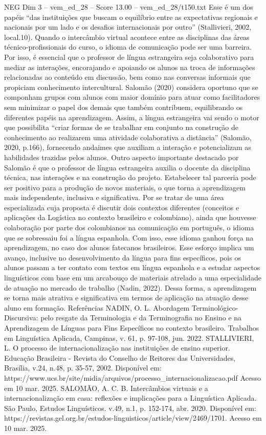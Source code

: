\begin{textsample}{NEG Dim 3 – vem\_ed\_28 – Score 13.00 – vem\_ed\_28/t150.txt}
Esse é um dos papéis “das instituições que buscam o equilíbrio entre as expectativas regionais e nacionais por um lado e os desafios internacionais por outro” (Stallivieri, 2002, local.10).
Quando o intercâmbio virtual acontece entre as disciplinas das áreas técnico-profissionais do curso, o idioma de comunicação pode ser uma barreira.
Por isso, é essencial que o professor de língua estrangeira seja colaborativo para mediar as interações, encorajando e apoiando os alunos na troca de informações relacionadas ao conteúdo em discussão, bem como nas conversas informais que propiciam conhecimento intercultural.
Salomão (2020) considera oportuno que se componham grupos com alunos com maior domínio para atuar como facilitadores sem minimizar o papel dos demais que também contribuem, equilibrando os diferentes papéis na aprendizagem.
Assim, a língua estrangeira vai sendo o motor que possibilita “criar formas de se trabalhar em conjunto na construção de conhecimento ao realizarem uma atividade colaborativa a distância” (Salomão, 2020, p.166), fornecendo andaimes que auxiliam a interação e potencializam as habilidades trazidas pelos alunos.
Outro aspecto importante destacado por Salomão é que o professor de língua estrangeira auxilia o docente da disciplina técnica, nas interações e na construção do projeto.
Estabelecer tal parceria pode ser positivo para a produção de novos materiais, o que torna a aprendizagem mais independente, inclusiva e significativa.
Por se tratar de uma área especializada cuja proposta é discutir dois contextos diferentes (conceitos e aplicações da Logística no contexto brasileiro e colombiano), ainda que houvesse colaboração por parte dos colombianos na comunicação em português, o idioma que se sobressaiu foi a língua espanhola.
Com isso, esse idioma ganhou força na aprendizagem, no caso dos alunos fatecanos brasileiros.
Esse esforço implica um avanço, inclusive no desenvolvimento da língua para fins específicos, pois os alunos passam a ter contato com textos em língua espanhola e a estudar aspectos linguísticos com base em um arcabouço de materiais atrelado a uma especialidade de atuação no mercado de trabalho (Nadin, 2022).
Dessa forma, a aprendizagem se torna mais atrativa e significativa em termos de aplicação na atuação desse aluno em formação.
Referências NADIN, O.
L.
Abordagem Terminológico-Discursiva: pelo resgate da Terminologia e da Terminografia no Ensino e na Aprendizagem de Línguas para Fins Específicos no contexto brasileiro.
Trabalhos em Linguística Aplicada, Campinas, v. 61, p. 97-108, jun. 2022.
STALLIVIERI, L.
O processo de internacionalização nas instituições de ensino superior.
Educação Brasileira - Revista do Conselho de Reitores das Universidades, Brasília, v.24, n.48, p. 35-57, 2002.
Disponível em: https://www.ucs.br/site/midia/arquivos/processo\_internacionalizacao.pdf Acesso em 10 mar. 2025.
SALOMÃO, A.
C.
B.
Intercâmbios virtuais e a internacionalização em casa: reflexões e implicações para a Linguística Aplicada.
São Paulo, Estudos Linguísticos. v.49, n.1, p. 152-174, abr. 2020.
Disponível em: https://revistas.gel.org.br/estudos-linguisticos/article/view/2469/1701.
Acesso em 10 mar. 2025.

\end{textsample}
